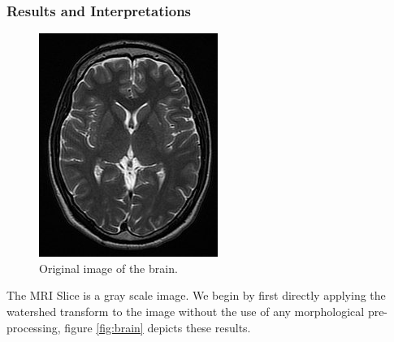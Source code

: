 \documentclass{article}
\begin{document}
\subsubsection{Results and Interpretations}
\begin{figure}[H] %
    \centering
    \includegraphics[scale=.6]{experiments/brain/brain.jpg}
    \caption{Original image of the brain.}
    \label{fig:brain_1}
\end{figure}
\begin{flushleft}
The MRI Slice is a gray scale image. We begin by first directly applying the watershed transform to the image without the use of any morphological pre-processing, figure \ref{fig:brain} depicts these results.
\end{flushleft}
\end{document}
